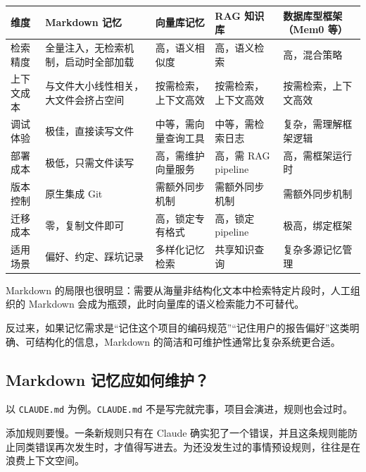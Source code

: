 \documentclass[9pt,a4paper,twocolumn]{ctexart}
\begin{document}
{\footnotesize
\begin{tabular}{|p{}|p{}|p{}|p{}|p{}|}
\hline
\textbf{维度} & \textbf{Markdown 记忆} & \textbf{向量库记忆} & \textbf{RAG 知识库} & \textbf{数据库型框架（Mem0 等）} \\
\hline
检索精度 & 全量注入，无检索机制，启动时全部加载 & 高，语义相似度 & 高，语义检索 & 高，混合策略 \\
\hline
上下文成本 & 与文件大小线性相关，大文件会挤占空间 & 按需检索，上下文高效 & 按需检索，上下文高效 & 按需检索，上下文高效 \\
\hline
调试体验 & 极佳，直接读写文件 & 中等，需向量查询工具 & 中等，需检索日志 & 复杂，需理解框架逻辑 \\
\hline
部署成本 & 极低，只需文件读写 & 高，需维护向量服务 & 高，需 RAG pipeline & 高，需框架运行时 \\
\hline
版本控制 & 原生集成 Git & 需额外同步机制 & 需额外同步机制 & 需额外同步机制 \\
\hline
迁移成本 & 零，复制文件即可 & 高，锁定专有格式 & 高，锁定 pipeline & 极高，绑定框架 \\
\hline
适用场景 & 偏好、约定、踩坑记录 & 多样化记忆检索 & 共享知识查询 & 复杂多源记忆管理 \\
\hline
\end{tabular}
}



Markdown 的局限也很明显：需要从海量非结构化文本中检索特定片段时，人工组织的 Markdown 会成为瓶颈，此时向量库的语义检索能力不可替代。



反过来，如果记忆需求是“记住这个项目的编码规范”“记住用户的报告偏好”这类明确、可结构化的信息，Markdown 的简洁和可维护性通常比复杂系统更合适。



\subsection*{Markdown 记忆应如何维护？}


以 \texttt{CLAUDE.md} 为例。\texttt{CLAUDE.md} 不是写完就完事，项目会演进，规则也会过时。



添加规则要慢。一条新规则只有在 Claude 确实犯了一个错误，并且这条规则能防止同类错误再次发生时，才值得写进去。为还没发生过的事情预设规则，往往是在浪费上下文空间。
\end{document}
